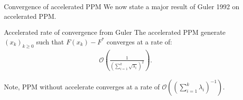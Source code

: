 \documentclass[11pt]{beamer}
\begin{document}
        \begin{frame}{Convergence of accelerated PPM} 
            We now state a major result of Guler 1992 \cite{guler_new_1992} on accelerated PPM. 
            \begin{block}{Accelerated rate of convergence from Guler}
                The accelerated PPM generate $(x_k)_{k\ge 0}$ such that $F(x_k) - F^*$ converges at a rate of: 
                {\large
                \begin{align*}
                    \mathcal O\left(
                        \frac{1}{\left(
                            \sum_{i = 1}^{k}\sqrt{\lambda_i}
                        \right)^2}
                    \right). 
                \end{align*}    
                }
            \end{block}
            Note, PPM without accelerate converges at a rate of $\mathcal O((\sum_{i = 1}^{k}\lambda_i)^{-1})$. 
        \end{frame}
\end{document}
